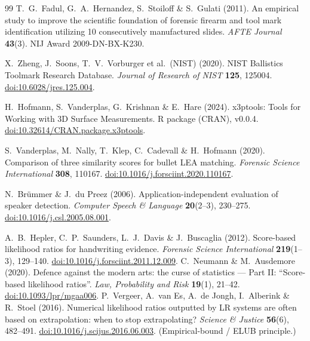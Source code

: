 \documentclass[11pt]{article}
\begin{document}
\begin{thebibliography}{99}
 T.~G.~Fadul, G.~A.~Hernandez, S.~Stoiloff \& S.~Gulati (2011).
  An empirical study to improve the scientific foundation of forensic firearm and
  tool mark identification utilizing 10 consecutively manufactured slides.
  \emph{AFTE Journal} \textbf{43}(3). NIJ Award 2009-DN-BX-K230.

 X.~Zheng, J.~Soons, T.~V.~Vorburger et al.\ (NIST) (2020).
  NIST Ballistics Toolmark Research Database. \emph{Journal of Research of NIST}
  \textbf{125}, 125004. \href{https://doi.org/10.6028/jres.125.004}{doi:10.6028/jres.125.004}.

 H.~Hofmann, S.~Vanderplas, G.~Krishnan \& E.~Hare (2024).
  x3ptools: Tools for Working with 3D Surface Measurements. R package (CRAN),
  v0.0.4. \href{https://doi.org/10.32614/CRAN.package.x3ptools}{doi:10.32614/CRAN.package.x3ptools}.

 S.~Vanderplas, M.~Nally, T.~Klep, C.~Cadevall \&
  H.~Hofmann (2020). Comparison of three similarity scores for bullet LEA
  matching. \emph{Forensic Science International} \textbf{308}, 110167.
  \href{https://doi.org/10.1016/j.forsciint.2020.110167}{doi:10.1016/j.forsciint.2020.110167}.

 N.~Br\"ummer \& J.~du Preez (2006). Application-independent
  evaluation of speaker detection. \emph{Computer Speech \& Language}
  \textbf{20}(2--3), 230--275. \href{https://doi.org/10.1016/j.csl.2005.08.001}{doi:10.1016/j.csl.2005.08.001}.

 A.~B.~Hepler, C.~P.~Saunders, L.~J.~Davis \& J.~Buscaglia
  (2012). Score-based likelihood ratios for handwriting evidence. \emph{Forensic
  Science International} \textbf{219}(1--3), 129--140.
  \href{https://doi.org/10.1016/j.forsciint.2011.12.009}{doi:10.1016/j.forsciint.2011.12.009}.
 C.~Neumann \& M.~Ausdemore (2020). Defence against the modern
  arts: the curse of statistics --- Part II: ``Score-based likelihood ratios''.
  \emph{Law, Probability and Risk} \textbf{19}(1), 21--42.
  \href{https://doi.org/10.1093/lpr/mgaa006}{doi:10.1093/lpr/mgaa006}.
 P.~Vergeer, A.~van Es, A.~de Jongh, I.~Alberink \& R.~Stoel
  (2016). Numerical likelihood ratios outputted by LR systems are often based on
  extrapolation: when to stop extrapolating? \emph{Science \& Justice}
  \textbf{56}(6), 482--491.
  \href{https://doi.org/10.1016/j.scijus.2016.06.003}{doi:10.1016/j.scijus.2016.06.003}.
  {\footnotesize (Empirical-bound / ELUB principle.)}


\end{thebibliography}
\end{document}
